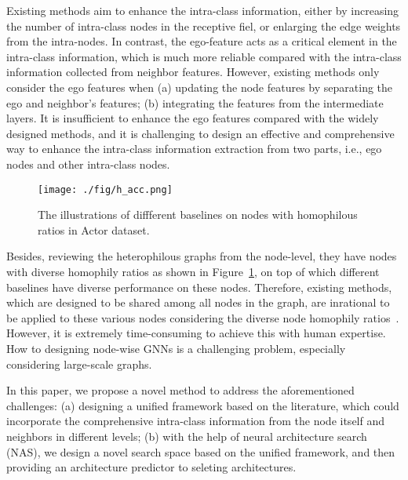 \documentclass[sigconf]{acmart}
\begin{document}
Existing methods aim to enhance the intra-class information, either by increasing the number of intra-class nodes in the receptive fiel, or enlarging the edge weights from the intra-nodes. 
In contrast, the ego-feature acts as a critical element in the intra-class information, which is much more reliable compared with the intra-class information collected from neighbor features. However, existing methods only consider the ego features when (a) updating the node features by separating the ego and neighbor's features; (b) integrating the features from the intermediate layers.
It is insufficient to enhance the ego features compared with the widely designed methods, and it is challenging to design an effective and comprehensive way to enhance the intra-class information extraction from two parts, i.e., ego nodes and other intra-class nodes.


\begin{figure}
	\centering
	\texttt{[image: ./fig/h\_acc.png]}
	\caption{The illustrations of diffferent baselines on nodes with homophilous ratios in Actor dataset.}
	\label{fig-hacc}
\end{figure}

Besides, reviewing the heterophilous graphs from the node-level,  they have nodes with diverse homophily ratios as shown in Figure~\ref{fig-hacc}, on top of which different baselines have diverse performance on these nodes. Therefore, existing methods, which are designed to be shared among all nodes in the graph, are inrational to be applied to these various nodes considering the diverse node homophily ratios~\cite{wang2022graph,du2022gbk}.
However, it is extremely time-consuming to achieve this with human expertise. How to designing node-wise GNNs is a challenging problem, especially considering large-scale graphs.




In this paper, we propose a novel method to address the aforementioned challenges: (a) designing a unified framework based on the literature, which could incorporate the comprehensive intra-class information from the node itself and neighbors in different levels; (b) with the help of neural architecture search (NAS), we design a novel search space based on the unified framework, and then providing an architecture predictor to seleting architectures.
\end{document}

